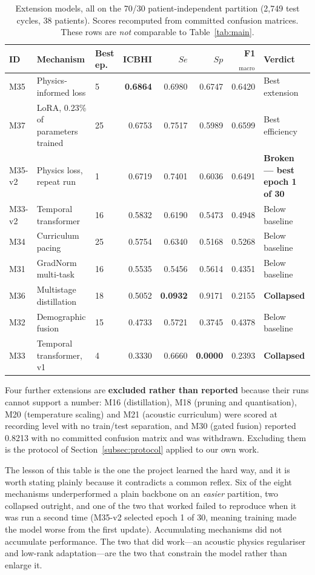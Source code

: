 \documentclass[journal,onecolumn]{IEEEtran}
\newcommand{\best}[1]{\textbf{#1}}
\begin{document}
\begin{table}[!t]
\centering
\caption{Extension models, all on the 70/30 patient-independent partition (2{,}749
test cycles, 38 patients). Scores recomputed from committed confusion matrices.
These rows are \emph{not} comparable to Table~\ref{tab:main}.}
\label{tab:extensions}
\small
\begin{tabular}{lllrrrrl}
\toprule
ID & Mechanism & Best ep. & ICBHI & $Se$ & $Sp$ & F1$_{\text{macro}}$ & Verdict \\
\midrule
M35    & Physics-informed loss     & \phantom{0}5 & \best{0.6864} & 0.6980 & 0.6747 & 0.6420 & Best extension \\
M37    & LoRA, 0.23\% of parameters trained & 25 & 0.6753 & 0.7517 & 0.5989 & 0.6599 & Best efficiency \\
M35-v2 & Physics loss, repeat run  & \phantom{0}1 & 0.6719 & 0.7401 & 0.6036 & 0.6491 & \best{Broken --- best epoch 1 of 30} \\
M33-v2 & Temporal transformer      & 16 & 0.5832 & 0.6190 & 0.5473 & 0.4948 & Below baseline \\
M34    & Curriculum pacing         & 25 & 0.5754 & 0.6340 & 0.5168 & 0.5268 & Below baseline \\
M31    & GradNorm multi-task       & 16 & 0.5535 & 0.5456 & 0.5614 & 0.4351 & Below baseline \\
M36    & Multistage distillation   & 18 & 0.5052 & \best{0.0932} & 0.9171 & 0.2155 & \best{Collapsed} \\
M32    & Demographic fusion        & 15 & 0.4733 & 0.5721 & 0.3745 & 0.4378 & Below baseline \\
M33    & Temporal transformer, v1  & \phantom{0}4 & 0.3330 & 0.6660 & \best{0.0000} & 0.2393 & \best{Collapsed} \\
\bottomrule
\end{tabular}

\vspace{2pt}
\footnotesize Four further extensions are \textbf{excluded rather than reported}
because their runs cannot support a number: M16 (distillation), M18 (pruning and
quantisation), M20 (temperature scaling) and M21 (acoustic curriculum) were scored
at recording level with no train/test separation, and M30 (gated fusion) reported
0.8213 with no committed confusion matrix and was withdrawn. Excluding them is the
protocol of Section~\ref{subsec:protocol} applied to our own work.
\end{table}

The lesson of this table is the one the project learned the hard way, and it is
worth stating plainly because it contradicts a common reflex. Six of the eight
mechanisms underperformed a plain backbone on an \emph{easier} partition, two
collapsed outright, and one of the two that worked failed to reproduce when it was
run a second time (M35-v2 selected epoch 1 of 30, meaning training made the model
worse from the first update). Accumulating mechanisms did not accumulate
performance. The two that did work---an acoustic physics regulariser and low-rank
adaptation---are the two that constrain the model rather than enlarge it.
\end{document}
